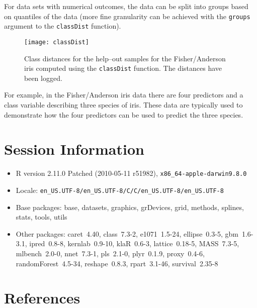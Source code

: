\documentclass[12pt]{article}
\begin{document}
For data sets with numerical outcomes, the data can be split into groups based on quantiles of the data (more fine granularity can be achieved with the \texttt{groups} argument to the \texttt{classDist} function).

\begin{figure}
   \begin{center}		
      \texttt{[image: classDist]}
      \caption{Class distances for the help--out samples for the Fisher/Anderson iris computed using the \texttt{classDist} function. The distances have been logged.}
      \label{F:classDist} 
    \end{center}
\end{figure} 

For example, in the Fisher/Anderson iris data there are four predictors and a class variable describing three species of iris. These data are typically used to demonstrate how the four predictors can be used to predict the three species. 


\section{Session Information}

\begin{itemize}\raggedright
  \item R version 2.11.0 Patched (2010-05-11 r51982), \verb|x86_64-apple-darwin9.8.0|
  \item Locale: \verb|en_US.UTF-8/en_US.UTF-8/C/C/en_US.UTF-8/en_US.UTF-8|
  \item Base packages: base, datasets, graphics, grDevices, grid,
    methods, splines, stats, tools, utils
  \item Other packages: caret~4.40, class~7.3-2, e1071~1.5-24,
    ellipse~0.3-5, gbm~1.6-3.1, ipred~0.8-8, kernlab~0.9-10,
    klaR~0.6-3, lattice~0.18-5, MASS~7.3-5, mlbench~2.0-0, nnet~7.3-1,
    pls~2.1-0, plyr~0.1.9, proxy~0.4-6, randomForest~4.5-34,
    reshape~0.8.3, rpart~3.1-46, survival~2.35-8
\end{itemize}
\section{References}
\end{document}
